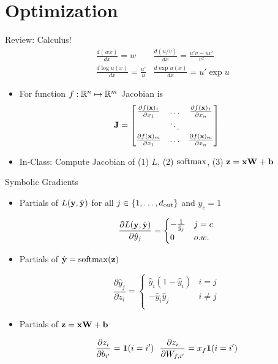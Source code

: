 \documentclass{beamer}
\begin{document}
\section{Optimization}
\begin{frame}{Review: Calculus!}
  \begin{align*} 
    &\frac{d (w x)  }{d x} = w   & \frac{d (u/v) }{d x} = \frac{u'v -   uv'} {v^2}  \\
   &\frac{d \log u(x) }{d x} = \frac{u'}{u}  & \frac{d \exp u(x) }{d x} =  u' \exp u  
  \end{align*}

  \begin{itemize}
  \item For function $f: \mathbb{R}^n \mapsto \mathbb{R}^m $ Jacobian is 
    \[ \mathbf{J} = \begin{bmatrix} \frac{\partial f(\mathbf{x})_1}{\partial x_1} & \ldots&  \frac{\partial f(\mathbf{x})_1}{\partial x_n} \\ 
      &\ddots& \\
      \frac{\partial f(\mathbf{x})_m}{\partial x_1} & \ldots &  \frac{\partial f(\mathbf{x})_m}{\partial x_n} \\ 
    \end{bmatrix}\]

     \item In-Class: Compute Jacobian of (1) $L$,  (2) $\softmax$, (3) $\mathbf{z} = \mathbf{x} \mathbf{W} + \mathbf{b}$ 
  \end{itemize}
  
  
\end{frame}


\begin{frame}{Symbolic Gradients}
  
  \begin{itemize}
  \item 

  Partials of $L(\mathbf{y}, \hat{\mathbf{y}})$ for all $j \in \{1, \ldots, {d_{\mathrm{out}}}\}$ and $y_c = 1$ 

  \[ \frac{\partial L(\mathbf{y}, \hat{\mathbf{y}})}{\partial \hat{y}_j} = \begin{cases}-\frac{1} {\hat{y}_j} & j = c\\ 0 & o.w. \end{cases}  \]
  \pause 

  \item
    Partials of $\hat{\boldy} = \softmax(\boldz)$ 

  \[ \frac{\partial \hat{y}_j }{\partial z_i} =
    \begin{cases}
      \hat{y}_i (1 - \hat{y}_i) & i = j\\
      - \hat{y}_i \hat{y}_j & i \neq j \\
    \end{cases} \]

  \pause 
  \item Partials of $\mathbf{z}  = \mathbf{x} \mathbf{W} + \mathbf{b} $ 

  \[ \frac{\partial z_i }{\partial b_{i'}} = \mathbf{1}(i = i') \ \  \frac{\partial z_i }{\partial W_{f, i'}} = x_f \mathbf{1}(i = i') \]

  \end{itemize}

\end{frame}
\end{document}
